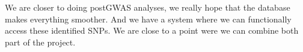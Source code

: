 We are closer to doing postGWAS analyses, we really hope that the database makes everything smoother.
And we have a system where we can functionally access these identified SNPs.
We are close to a point were we can combine both part of the project.
